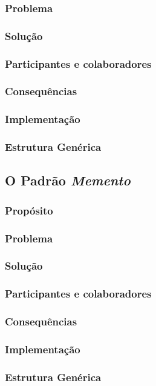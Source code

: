 \documentclass[
	11pt,				%
	openright,
	twoside,			%
	a4paper,			%
	english,			%
	french,
	brazil,				%
	sumario=tradicional
	]{abntex2}
\begin{document}
\subsubsection{Problema}
\subsubsection{Solução}
\subsubsection{Participantes e colaboradores}
\subsubsection{Consequências}
\subsubsection{Implementação}
\subsubsection{Estrutura Genérica}

\subsection{O Padrão \textit{Memento}}
\subsubsection{Propósito}
\subsubsection{Problema}
\subsubsection{Solução}
\subsubsection{Participantes e colaboradores}
\subsubsection{Consequências}
\subsubsection{Implementação}
\subsubsection{Estrutura Genérica}
\end{document}
